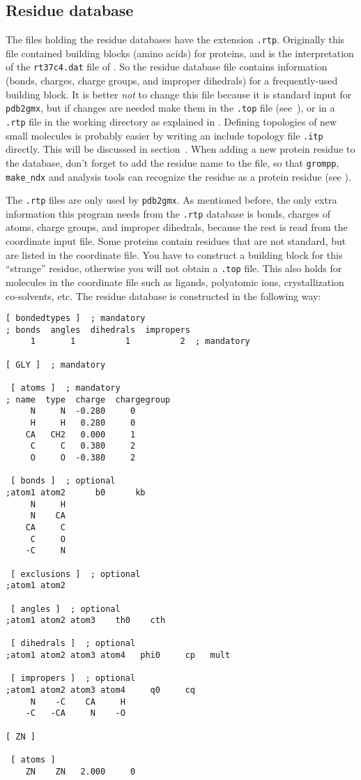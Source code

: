 \subsection{Residue database}
\label{subsec:rtp}
The files holding the residue databases have the extension {\tt .rtp}.
Originally this file contained building blocks (amino acids) for proteins,
and is the {\gromacs} interpretation of the {\tt rt37c4.dat} file of {\gromos}.
So the residue database file contains information (bonds, charges, charge groups,
and improper dihedrals) for a frequently-used building block. It is
better {\em not} to change this file because it is standard input for
{\tt pdb2gmx}, but if changes are needed make them in the
{\tt *.top} file (see~), or in a {\tt .rtp} file
in the working directory as explained in .
Defining topologies of new small molecules is probably easier
by writing an include topology file {\tt *.itp} directly.
This will be discussed in section~.
When adding a new protein residue to the database, don't forget to
add the residue name to the {\tt {}} file,
so that {\tt grompp}, {\tt make_ndx} and analysis tools can recognize
the residue as a protein residue (see ).

The {\tt .rtp} files are only used by {\tt pdb2gmx}.
As mentioned before, the only extra information this
program needs from the {\tt .rtp} database is bonds, charges of atoms,
charge groups, and improper dihedrals, because the rest is read from
the coordinate input file.
Some proteins contain residues that are not standard, but are
listed in the coordinate file. You have to construct a building block
for this ``strange'' residue, otherwise you will not obtain a
{\tt *.top} file. This also holds for molecules in the
coordinate file such as ligands, polyatomic ions, crystallization co-solvents, etc.
The residue database is constructed in the following way:

{\small
\begin{verbatim}
[ bondedtypes ]  ; mandatory
; bonds  angles  dihedrals  impropers
     1       1          1          2  ; mandatory

[ GLY ]  ; mandatory

 [ atoms ]  ; mandatory 
; name  type  charge  chargegroup 
     N     N  -0.280     0
     H     H   0.280     0
    CA   CH2   0.000     1
     C     C   0.380     2
     O     O  -0.380     2

 [ bonds ]  ; optional
;atom1 atom2      b0      kb
     N     H
     N    CA
    CA     C
     C     O
    -C     N

 [ exclusions ]  ; optional
;atom1 atom2

 [ angles ]  ; optional
;atom1 atom2 atom3    th0    cth

 [ dihedrals ]  ; optional
;atom1 atom2 atom3 atom4   phi0     cp   mult

 [ impropers ]  ; optional
;atom1 atom2 atom3 atom4     q0     cq
     N    -C    CA     H
    -C   -CA     N    -O

[ ZN ]

 [ atoms ]
    ZN    ZN   2.000     0
\end{verbatim}}

